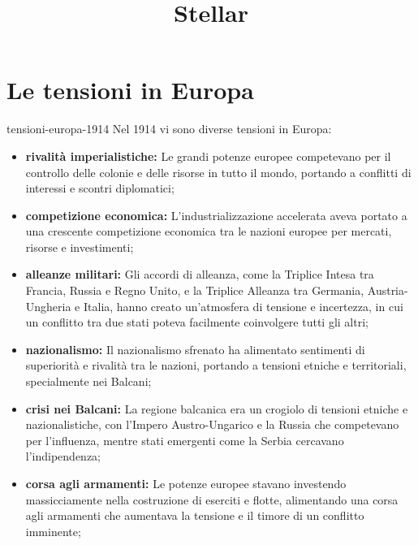 \documentclass[preview]{standalone}
\begin{document}
\title{Stellar}
\genpage

\section{Le tensioni in Europa}


\begin{snippet}{tensioni-europa-1914}
    Nel 1914 vi sono diverse tensioni in Europa:
    \begin{itemize}
        \item \textbf{rivalità imperialistiche:} Le grandi potenze europee competevano per il controllo delle colonie e delle risorse in tutto il mondo, portando a conflitti di interessi e scontri diplomatici;
        \item \textbf{competizione economica:} L'industrializzazione accelerata aveva portato a una crescente competizione economica tra le nazioni europee per mercati, risorse e investimenti;
        \item \textbf{alleanze militari:} Gli accordi di alleanza, come la Triplice Intesa tra Francia, Russia e Regno Unito, e la Triplice Alleanza tra Germania, Austria-Ungheria e Italia, hanno creato un'atmosfera di tensione e incertezza, in cui un conflitto tra due stati poteva facilmente coinvolgere tutti gli altri;
        \item \textbf{nazionalismo:} Il nazionalismo sfrenato ha alimentato sentimenti di superiorità e rivalità tra le nazioni, portando a tensioni etniche e territoriali, specialmente nei Balcani;
        \item \textbf{crisi nei Balcani:} La regione balcanica era un crogiolo di tensioni etniche e nazionalistiche, con l'Impero Austro-Ungarico e la Russia che competevano per l'influenza, mentre stati emergenti come la Serbia cercavano l'indipendenza;
        \item \textbf{corsa agli armamenti:} Le potenze europee stavano investendo massicciamente nella costruzione di eserciti e flotte, alimentando una corsa agli armamenti che aumentava la tensione e il timore di un conflitto imminente;
    \end{itemize}
\end{snippet}
\end{document}

